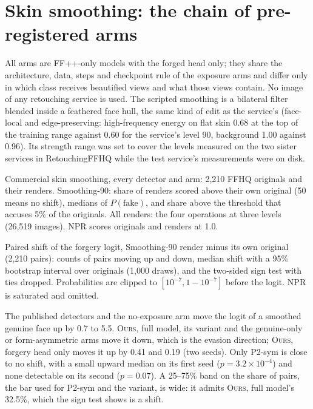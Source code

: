 \documentclass[10pt]{article}
\newcommand{\oursB}{\textsc{Ours}, forgery head only}
\newcommand{\oursF}{\textsc{Ours}, full model}
\begin{document}
\section{Skin smoothing: the chain of pre-registered arms}
\label{sec:chain}
All arms are FF++-only models with the forged head only; they share the architecture, data, steps and checkpoint rule of the
exposure arms and differ only in which class receives beautified views and what those views contain. No image of any retouching
service is used. The scripted smoothing is a bilateral filter blended inside a feathered face hull, the same kind of edit as the
service's (face-local and edge-preserving: high-frequency energy on flat skin 0.68 at the top of the training range against 0.60
for the service's level 90, background 1.00 against 0.96). Its strength range was set to cover the levels measured on the two
sister services in RetouchingFFHQ while the test service's measurements were on disk.

\begin{table}[H]
\centering
\caption{Commercial skin smoothing, every detector and arm: 2,210 FFHQ originals and their renders. Smoothing-90: share of renders
scored above their own original (50 means no shift), medians of $P(\text{fake})$, and share above the threshold that accuses 5\% of
the originals. All renders: the four operations at three levels (26,519 images). NPR scores originals and renders at 1.0.}
\label{tab:v4retouch}
\scriptsize
\begin{adjustbox}{max width=\linewidth}\end{adjustbox}
\end{table}
\begin{table}[H]
\centering
\caption{Paired shift of the forgery logit, Smoothing-90 render minus its own original (2,210 pairs): counts of pairs moving up and
down, median shift with a 95\% bootstrap interval over originals (1,000 draws), and the two-sided sign test with ties dropped.
Probabilities are clipped to $[10^{-7}, 1-10^{-7}]$ before the logit. NPR is saturated and omitted.}
\label{tab:shiftall}
\footnotesize

\end{table}
The published detectors and the no-exposure arm move the logit of a smoothed genuine face up by 0.7 to 5.5. \oursF{}, its variant
and the genuine-only or form-asymmetric arms move it down, which is the evasion direction; \oursB{} moves it up by 0.41 and 0.19
(two seeds). Only P2-sym is close to no shift, with a small upward median on its first seed ($p=3.2\times10^{-4}$) and none detectable on
its second ($p=0.07$). A 25--75\% band on the share of pairs, the bar used for P2-sym and the variant, is wide: it admits \oursF{}'s
32.5\%, which the sign test shows is a shift.
\end{document}
